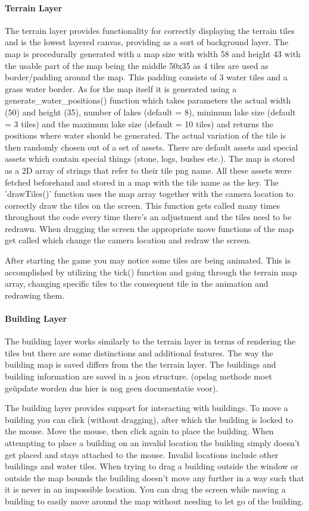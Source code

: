 \documentclass[12pt]{article}
\begin{document}
\paragraph{Terrain Layer}
The terrain layer provides functionality for correctly displaying the terrain tiles and is the lowest layered canvas,
providing as a sort of background layer.
The map is procedurally generated with a map size with width 58 and height 43
with the usable part of the map being the middle 50x35 as 4 tiles are used as border/padding around the map. This padding
consists of 3 water tiles and a grass water border. As for the map itself it is generated using a generate_water_positions()
function which takes parameters the actual width (50) and height (35), number of lakes (default = 8), minimum lake size
(default = 3 tiles) and the maximum lake size (default = 10 tiles) and returns the positions where water should be generated.
The actual variation of the tile is then randomly chosen out of a set of assets. There are default assets and special assets
which contain special things (stone, logs, bushes etc.).
The map is stored as a 2D array of strings that refer to their tile png name.
All these assets were fetched beforehand and stored in a map with the tile name as the key. The 'drawTiles()' function
uses the map array together with the camera location to correctly draw the tiles on the screen. This function gets
called many times throughout the code every time there's an adjustment and the tiles need to be redrawn. When dragging
the screen the appropriate move functions of the map get called which change the camera location and redraw the screen.

After starting the game you may notice some tiles are being animated. This is accomplished by utilizing the tick()
function and going through the terrain map array, changing specific tiles to the consequent tile in the animation and
redrawing them.

\paragraph{Building Layer} The building layer works similarly to the terrain layer in terms of rendering the tiles but
there are some distinctions and  additional features. The way the building map is saved differs from the the terrain
layer. The buildings and building information are saved in a json structure. (opslag methode moet geüpdate worden dus
hier is nog geen documentatie voor).

The building layer provides support for interacting with buildings. To move a building you can click (without dragging),
after which the building is locked to the mouse. Move the mouse, then click again to place the building. When attempting
to place a building on an invalid location the building simply doesn't get placed and stays attached to the mouse.
Invalid locations include other buildings and water tiles. When trying to drag a building outside the window or outside
the map bounds the building doesn't move any further in a way such that it is never in an impossible location. You can
drag the screen while moving a building to easily move around the map without needing to let go of the building.
\end{document}
